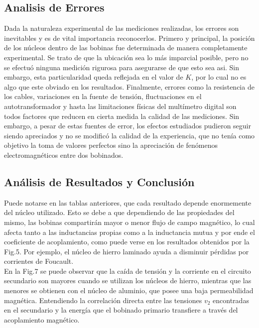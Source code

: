 \documentclass[a4paper,12pt]{article}
\begin{document}
\subsection{Analisis de Errores}
\hspace{1cm} Dada la naturaleza experimental de las mediciones realizadas, los errores son inevitables y es de vital importancia reconocerlos.
Primero y principal, la posición de los núcleos dentro de las bobinas fue determinada de manera completamente experimental. Se trato de que la 
ubicación sea lo más imparcial posible, pero no se efectuó ninguna medición rigurosa para asegurarse de que esto sea asi. Sin embargo, esta 
particularidad queda reflejada en el valor de $K$, por lo cual no es algo que este obviado en los resultados. Finalmente, errores como la 
resistencia de los cables, variaciones en la fuente de tensión, fluctuaciones en el  autotransformador y hasta las limitaciones físicas del 
multímetro digital son todos factores que reducen en cierta medida la calidad de las mediciones. Sin embargo, a pesar de estas fuentes de error, 
los efectos estudiados pudieron seguir siendo apreciados y no se modificó la calidad de la experiencia, que no tenía como objetivo la toma de 
valores perfectos sino la apreciación de fenómenos electromagnéticos entre dos bobinados.

\subsection{Análisis de Resultados y Conclusión}
\hspace{1cm} Puede notarse en las tablas anteriores, que cada resultado depende enormemente del núcleo utilizado. Esto se debe a que 
dependiendo de las propiedades del mismo, las bobinas compartirán mayor o menor flujo de campo magnético, lo cual afecta tanto a las 
inductancias propias como a la inductancia mutua y por ende el coeficiente de acoplamiento, como puede verse en los resultados obtenidos
por la Fig.5. Por ejemplo, el núcleo de hierro laminado ayuda a disminuir pérdidas por corrientes de Foucault.
\\En la Fig.7 se puede observar que la caída de tensión y la corriente en el circuito secundario son mayores cuando se utilizan 
los núcleos de hierro, mientras que las menores se obtienen con el núcleo de aluminio, que posee una baja permeabilidad magnética.
Entendiendo la correlación directa entre las tensiones $v_2$ encontradas en el secundario y la energía que el bobinado primario
transfiere a través del acoplamiento magnético.
\end{document}
